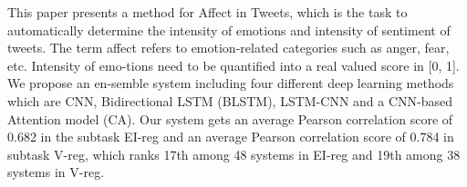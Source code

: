 This paper presents a method for Affect in Tweets, which is the task to automatically determine the intensity of emotions and intensity of sentiment of tweets. The term affect refers to emotion-related categories such as anger, fear, etc. Intensity of emo-tions need to be quantified into a real valued score in [0, 1]. We propose an en-semble system including four different deep learning methods which are CNN, Bidirectional LSTM (BLSTM), LSTM-CNN and a CNN-based Attention model (CA). Our system gets an average Pearson correlation score of 0.682 in the subtask EI-reg and an average Pearson correlation score of 0.784 in subtask V-reg, which ranks 17th among 48 systems in EI-reg and 19th among 38 systems in V-reg.
